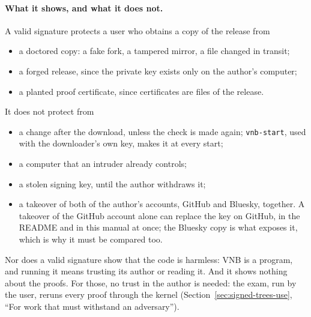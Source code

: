 \paragraph{What it shows, and what it does not.}  A valid signature
protects a user who obtains a copy of the release from
\begin{itemize}
\item a doctored copy: a fake fork, a tampered mirror, a file changed in
  transit;
\item a forged release, since the private key exists only on the
  author's computer;
\item a planted proof certificate, since certificates are files of the
  release.
\end{itemize}
It does not protect from
\begin{itemize}
\item a change after the download, unless the check is made again;
  \texttt{vnb-start}, used with the downloader's own key, makes it at
  every start;
\item a computer that an intruder already controls;
\item a stolen signing key, until the author withdraws it;
\item a takeover of both of the author's accounts, GitHub and Bluesky,
  together.  A takeover of the GitHub account alone can replace the key
  on GitHub, in the README and in this manual at once; the Bluesky
  copy is what exposes it, which is why it must be compared too.
\end{itemize}

Nor does a valid signature show that the code is harmless: VNB is a
program, and running it means trusting its author or reading it.  And
it shows nothing about the proofs.  For those, no trust in the author
is needed: the exam, run by the user, reruns every proof through the
kernel (Section~\ref{sec:signed-trees-use}, ``For work that must
withstand an adversary'').
